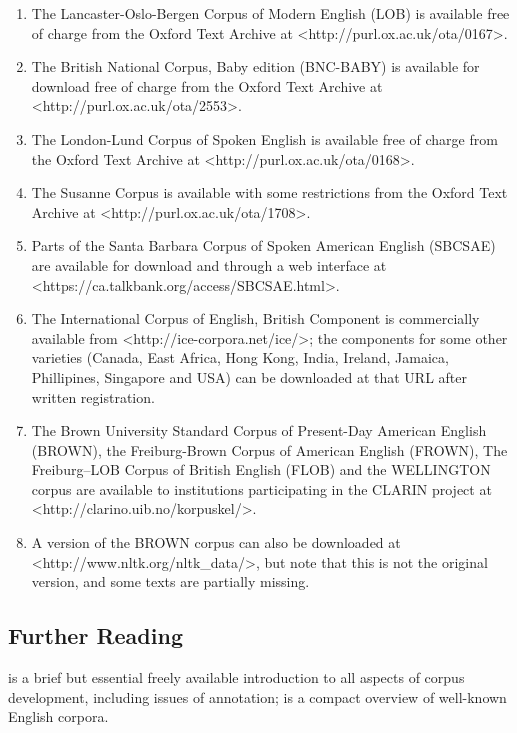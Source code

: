 \begin{enumerate}
  \item The Lancaster-Oslo-Bergen Corpus of Modern English (LOB) is available free of charge from the Oxford Text Archive at <http://purl.ox.ac.uk/ota/0167>.
  \item The British National Corpus, Baby edition (BNC-BABY) is available for download free of charge from the Oxford Text Archive at <http://purl.ox.ac.uk/ota/2553>.
  \item The London-Lund Corpus of Spoken English is available free of charge from the Oxford Text Archive at <http://purl.ox.ac.uk/ota/0168>.
  \item The Susanne Corpus is available with some restrictions from the Oxford Text Archive at <http://purl.ox.ac.uk/ota/1708>.
  \item Parts of the Santa Barbara Corpus of Spoken American English (SBCSAE) are available for download and through a web interface at <https://ca.talkbank.org/access/SBCSAE.html>.
  \item The International Corpus of English, British Component is commercially available from <http://ice-corpora.net/ice/>; the components for some other varieties (Canada, East Africa, Hong Kong, India, Ireland, Jamaica, Phillipines, Singapore and USA) can be downloaded at that URL after written registration.
  \item The Brown University Standard Corpus of Present-Day American English (BROWN), the Freiburg-Brown Corpus of American English (FROWN), The Freiburg–LOB Corpus of British English (FLOB) and the WELLINGTON corpus are available to institutions participating in the CLARIN project at <http://clarino.uib.no/korpuskel/>.
  \item A version of the BROWN corpus can also be downloaded at <http://www.nltk.org/nltk\_data/>, but note that this is not the original version, and some texts are partially missing.
\end{enumerate}

\subsection{Further Reading}
\label{sec:furtherreading02}

\citet{wynne_developing_2005} is a brief but essential freely available introduction to all aspects of corpus development, including issues of annotation; \citet{ludeling_well-known_2008} is a compact overview of well-known English corpora.


